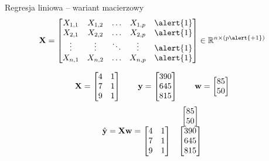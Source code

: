 \documentclass{sa}
\renewcommand{\vec}[1]{\ensuremath\mathbf{#1}}
\begin{document}
\begin{frame}{Regresja liniowa -- wariant macierzowy}
\[ \vec{X} = \begin{bmatrix}
X_{1,1} & X_{1,2} & \ldots & X_{1,p} & \alert{1} \\
X_{2,1} & X_{2,2} & \ldots & X_{2,p} & \alert{1}\\
\vdots & \vdots & \ddots & \vdots & \alert{1}\\
X_{n,1} & X_{n,2} & \ldots & X_{n,p} & \alert{1}\\
\end{bmatrix} \in \R^{n\times (p\alert{+1})} \]

\pause
\[
\vec{X} = \begin{bmatrix}
4 & 1\\
7 & 1\\
9 & 1\\
\end{bmatrix}
\qquad
\vec{y}=\begin{bmatrix}
390 \\
645 \\
815 \\
\end{bmatrix}
\qquad
\vec{w}=\begin{bmatrix}
85 \\ 50
\end{bmatrix}
\]
\[
\hat{\vec{y}} = \vec{X}\vec{w}=\begin{matrix}
& \begin{bmatrix}
85 \\ 50
\end{bmatrix} \\
\begin{bmatrix}
4 & 1\\
7 & 1\\
9 & 1\\
\end{bmatrix}
&
\begin{bmatrix}
390 \\ 645 \\ 815
\end{bmatrix}
\end{matrix}
\]
\end{frame}
\end{document}
